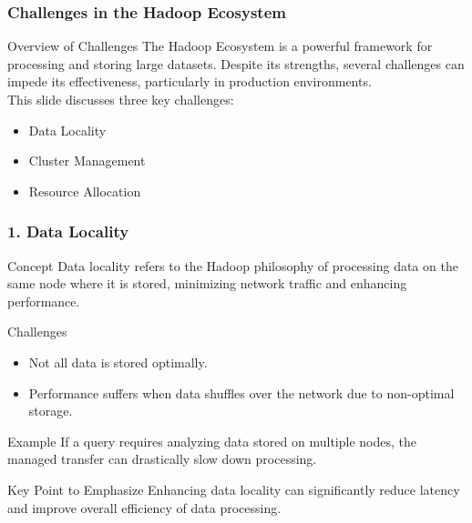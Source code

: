 \documentclass[aspectratio=169]{beamer}
\begin{document}
\begin{frame}[fragile]
    \frametitle{Challenges in the Hadoop Ecosystem}
    \begin{block}{Overview of Challenges}
        The Hadoop Ecosystem is a powerful framework for processing and storing large datasets. Despite its strengths, several challenges can impede its effectiveness, particularly in production environments.
        \\[0.2cm]
        This slide discusses three key challenges:
        \begin{itemize}
            \item Data Locality
            \item Cluster Management
            \item Resource Allocation
        \end{itemize}
    \end{block}
\end{frame}

\begin{frame}[fragile]
    \frametitle{1. Data Locality}
    \begin{block}{Concept}
        Data locality refers to the Hadoop philosophy of processing data on the same node where it is stored, minimizing network traffic and enhancing performance.
    \end{block}
    
    \begin{block}{Challenges}
        \begin{itemize}
            \item Not all data is stored optimally.
            \item Performance suffers when data shuffles over the network due to non-optimal storage.
        \end{itemize}
    \end{block}
    
    \begin{block}{Example}
        If a query requires analyzing data stored on multiple nodes, the managed transfer can drastically slow down processing.
    \end{block}
    
    \begin{block}{Key Point to Emphasize}
        Enhancing data locality can significantly reduce latency and improve overall efficiency of data processing.
    \end{block}
\end{frame}
\end{document}
